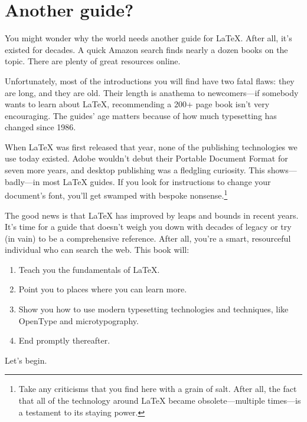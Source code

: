 \section{Another guide?}

You might wonder why the world needs another guide for \LaTeX{}.
After all, it's existed for decades.
A quick Amazon search finds nearly a dozen books on the topic.
There are plenty of great resources online.

Unfortunately, most of the introductions you will find have two fatal flaws:
they are long, and they are old.
Their length is anathema to newcomers---if somebody wants to learn about \LaTeX{},
recommending a 200+ page book isn't very encouraging.
The guides' age matters because of how much typesetting has changed since 1986.

When \LaTeX{} was first released that year, none of the publishing technologies
we use today existed.
Adobe wouldn't debut their Portable Document Format for seven more years,
and desktop publishing was a fledgling curiosity.
This shows---badly---in most \LaTeX{} guides.
If you look for instructions to change your document's font,
you'll get swamped with bespoke nonsense.\punckern\footnote{%
Take any criticisms that you find here with a grain of
salt. After all, the fact that all of the technology around \LaTeX{} became
obsolete---multiple times---is a testament to its staying power.}

The good news is that  \LaTeX{} has improved by leaps and bounds in recent years.
It's time for a guide that doesn't weigh you down with decades of legacy
or try (in vain) to be a comprehensive reference.
After all, you're a smart, resourceful individual who can search the web.
This book will:

\begin{enumerate}
\item Teach you the fundamentals of \LaTeX.
\item Point you to places where you can learn more.
\item Show you how to use modern typesetting technologies and techniques,
    like OpenType and microtypography.
\item End promptly thereafter.
\end{enumerate}
\vspace{\baselineskip}

\noindent Let's begin.
